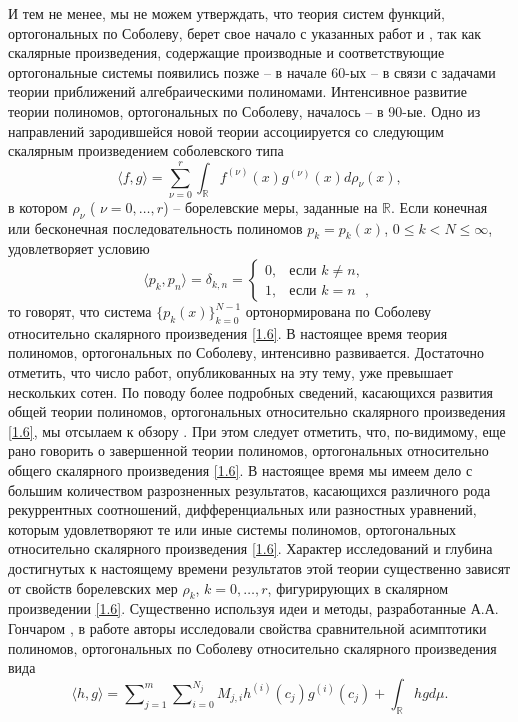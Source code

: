 И тем не менее, мы не можем утверждать, что теория систем функций, ортогональных по Соболеву, берет свое начало с указанных работ \cite{Faber} и \cite{Shauder}, так как скалярные произведения, содержащие производные и соответствующие ортогональные системы появились   \cite{Althammer} позже -- в начале 60-ых -- в связи с задачами теории приближений алгебраическими полиномами. Интенсивное развитие теории полиномов, ортогональных по Соболеву, началось   \cite{IserKoch} -- \cite{KwonLittl2} в  90-ые. Одно из направлений зародившейся новой теории ассоциируется со следующим скалярным произведением соболевского типа
\begin{equation}\label{1.6}
\langle f,g\rangle=\sum_{\nu=0}^r\int_{\mathbb{R}}f^{(\nu)}(x)g^{(\nu)}(x)d\rho_\nu(x),
\end{equation}
в котором $\rho_\nu$ ( $\nu=0,\ldots,r$) --  борелевские меры, заданные на $\mathbb{R}$. Если конечная или бесконечная  последовательность полиномов $p_k=p_k(x)$, $0\le k< N\le\infty$, удовлетворяет условию
\begin{equation}\label{1.7}
\langle p_k,p_n\rangle=\delta_{k,n}=\begin{cases}0,&\text{если $k\ne n$, }\\1,&\text{если $k= n$ }, \end{cases}
\end{equation}
то говорят, что система  $\{p_k(x)\}_{k=0}^{N-1}$ ортонормирована по Соболеву относительно скалярного произведения \eqref{1.6}. В настоящее время теория полиномов, ортогональных по Соболеву, интенсивно развивается. Достаточно отметить, что число работ, опубликованных  на эту тему, уже превышает нескольких сотен. По поводу более подробных сведений, касающихся развития общей теории полиномов, ортогональных относительно скалярного произведения \eqref{1.6}, мы отсылаем к обзору \cite{MarcelXu}. При этом следует отметить, что, по-видимому, еще рано говорить о завершенной теории полиномов, ортогональных относительно общего скалярного произведения \eqref{1.6}. В настоящее время мы имеем дело с большим количеством разрозненных результатов, касающихся различного рода рекуррентных соотношений, дифференциальных или разностных уравнений, которым удовлетворяют те или иные системы полиномов, ортогональных относительно скалярного произведения \eqref{1.6}. Характер исследований и глубина достигнутых к настоящему времени результатов этой теории существенно зависят от свойств борелевских мер $\rho_k$, $k=0,\ldots,r$, фигурирующих в скалярном произведении \eqref{1.6}. Существенно используя идеи и методы, разработанные А.А. Гончаром \cite{Gonchar1975}, в работе \cite{Lopez1995} авторы исследовали свойства сравнительной асимптотики полиномов, ортогональных по Соболеву относительно скалярного произведения вида
$$
\langle h,g\rangle=\sum\nolimits_{j=1}^m\sum\nolimits_{i=0}^{N_j}M_{j,i}h^{(i)}(c_j)g^{(i)}(c_j)+\int_{\mathbb{R}}hgd\mu.
$$

